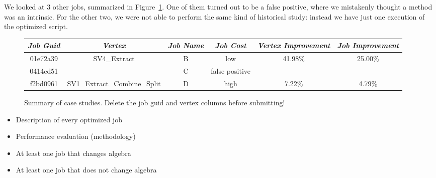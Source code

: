 We looked at 3 other jobs, summarized in Figure~\ref{fig:caseStudySummary}.
One of them turned out to be a false positive, where we mistakenly thought a method was an intrinsic.
For the other two, we were not able to perform the same kind of historical study: instead we have just one execution of the optimized script.
\begin{figure}[ht]
\begin{tabular}{c|c|c|c|c|c} 
{\em Job Guid} & {\em Vertex} & {\em Job Name} & {\em Job Cost} & {\em Vertex Improvement} & {\em Job Improvement} \\ \hline
01e72a39 & SV4\_Extract & B & low & 41.98\% & 25.00\% \\
0414cd51 & & C & false positive \\
f2bd0961 & SV1\_Extract\_Combine\_Split & D & high & 7.22\% & 4.79\%
\end{tabular}
\caption{Summary of case studies. {\sc Delete the job guid and vertex columns before submitting!}
\label{fig:caseStudySummary}}
\end{figure}




\begin{itemize}
\item Description of every optimized job
\item Performance evaluation (methodology)
\item At least one job that changes algebra
\item At least one job that does not change algebra
\end{itemize}

